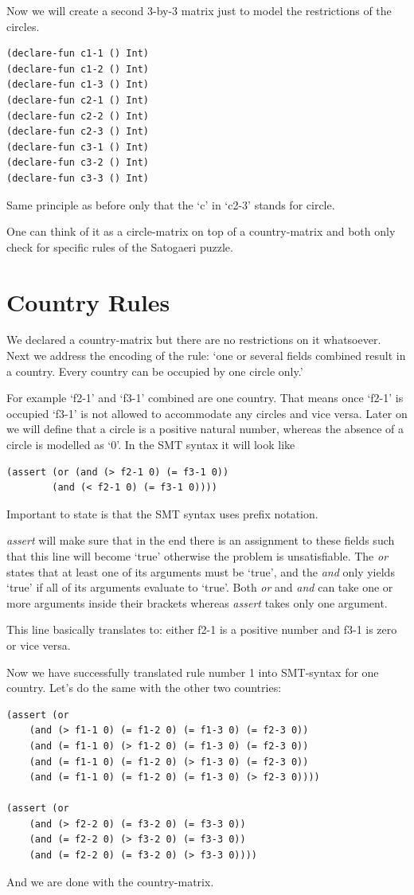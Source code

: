 Now we will create a second 3-by-3 matrix just to model the restrictions of the circles.
\begin{lstlisting}
(declare-fun c1-1 () Int)
(declare-fun c1-2 () Int)
(declare-fun c1-3 () Int)
(declare-fun c2-1 () Int)
(declare-fun c2-2 () Int)
(declare-fun c2-3 () Int)
(declare-fun c3-1 () Int)
(declare-fun c3-2 () Int)
(declare-fun c3-3 () Int)
\end{lstlisting}
Same principle as before only that the `c' in `c2-3' stands for circle.

One can think of it as a circle-matrix on top of a country-matrix and both only check for specific rules of the Satogaeri puzzle.

\section{Country Rules}
We declared a country-matrix but there are no restrictions on it whatsoever. Next we address the encoding of the rule: `one or several fields combined result in a country. Every country can be occupied by one circle only.'

For example `f2-1' and `f3-1' combined are one country. That means once `f2-1' is occupied `f3-1' is not allowed to accommodate any circles and vice versa. Later on we will define that a circle is a positive natural number, whereas the absence of a circle is modelled as `0'. In the SMT syntax it will look like
\begin{lstlisting}
(assert (or (and (> f2-1 0) (= f3-1 0)) 
	    (and (< f2-1 0) (= f3-1 0))))
\end{lstlisting}
Important to state is that the SMT syntax uses prefix notation. 

\emph{assert} will make sure that in the end there is an assignment to these fields such that this line will become `true' otherwise the problem is unsatisfiable. The \emph{or} states that at least one of its arguments must be `true', and the \emph{and} only yields `true' if all of its arguments evaluate to `true'. Both \emph{or} and \emph{and} can take one or more arguments inside their brackets whereas \emph{assert} takes only one argument.

This line basically translates to: either f2-1 is a positive number and f3-1 is zero or vice versa.

Now we have successfully translated rule number 1 into SMT-syntax for one country. Let's do the same with the other two countries:

\begin{lstlisting}
(assert (or 
	(and (> f1-1 0) (= f1-2 0) (= f1-3 0) (= f2-3 0)) 
	(and (= f1-1 0) (> f1-2 0) (= f1-3 0) (= f2-3 0)) 
	(and (= f1-1 0) (= f1-2 0) (> f1-3 0) (= f2-3 0)) 
	(and (= f1-1 0) (= f1-2 0) (= f1-3 0) (> f2-3 0))))

(assert (or 
	(and (> f2-2 0) (= f3-2 0) (= f3-3 0)) 
	(and (= f2-2 0) (> f3-2 0) (= f3-3 0)) 
	(and (= f2-2 0) (= f3-2 0) (> f3-3 0))))
\end{lstlisting}
And we are done with the country-matrix.

